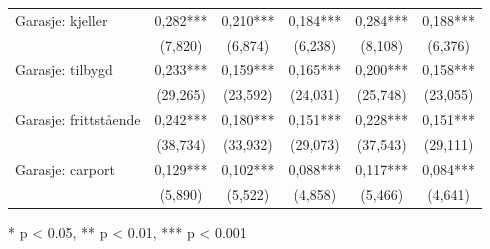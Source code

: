 \documentclass[
  norsk,
  a4paper,
]{article}
\begin{document}
\begin{table}
{\begin{tabular*}{\linewidth}{@{\extracolsep{\fill}}lccccc}
Garasje: kjeller & 0,282*** & 0,210*** & 0,184*** & 0,284*** & 0,188*** \\ 
 & (7,820) & (6,874) & (6,238) & (8,108) & (6,376) \\ 
Garasje: tilbygd & 0,233*** & 0,159*** & 0,165*** & 0,200*** & 0,158*** \\ 
 & (29,265) & (23,592) & (24,031) & (25,748) & (23,055) \\ 
Garasje: frittstående & 0,242*** & 0,180*** & 0,151*** & 0,228*** & 0,151*** \\ 
 & (38,734) & (33,932) & (29,073) & (37,543) & (29,111) \\ 
Garasje: carport & 0,129*** & 0,102*** & 0,088*** & 0,117*** & 0,084*** \\ 
 & (5,890) & (5,522) & (4,858) & (5,466) & (4,641) \\ 
\bottomrule
\end{tabular*}
\begin{minipage}{\linewidth}
\vspace{.05em}
* p < 0.05, ** p < 0.01, *** p < 0.001\\
\end{minipage}

}

\end{table}%
\end{document}
